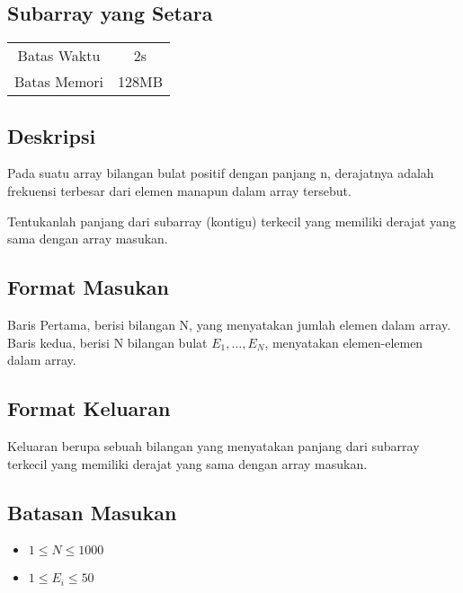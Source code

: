 \documentclass{article}
\begin{document}
\begin{center}
    \section*{Subarray yang Setara} %

    \begin{tabular}{ | c c | }
        \hline
        Batas Waktu  & 2s \\    %
        Batas Memori & 128MB \\  %
        \hline
    \end{tabular}
\end{center}

\subsection*{Deskripsi}
Pada suatu array bilangan bulat positif dengan panjang n, derajatnya adalah frekuensi terbesar dari elemen manapun dalam array tersebut.

Tentukanlah panjang dari subarray (kontigu) terkecil yang memiliki derajat yang sama dengan array masukan.


\subsection*{Format Masukan}
Baris Pertama, berisi bilangan N, yang menyatakan jumlah elemen dalam array.
Baris kedua, berisi N bilangan bulat $E_1, …, E_N$, menyatakan  elemen-elemen dalam array.


\subsection*{Format Keluaran}
Keluaran berupa sebuah bilangan yang menyatakan panjang dari subarray terkecil yang memiliki derajat yang sama dengan array masukan.

\subsection*{Batasan Masukan}
\begin{itemize}
 \item $1 \leq  N  \leq 1000$
 \item $1 \leq  {E_i}  \leq 50$
\end{itemize}
\end{document}
